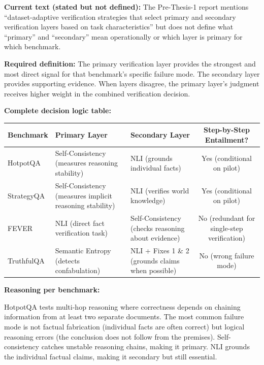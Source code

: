 \documentclass[11pt,a4paper]{article}
\newcommand{\architecturebox}[2]{%
\begin{tcolorbox}[enhanced,breakable,
  colback=LightTeal,colframe=Teal,boxrule=1.5pt,arc=4pt,
  left=8pt,right=8pt,top=6pt,bottom=6pt,
  title={\bfseries\small\color{white}#1},
  attach boxed title to top left={yshift=-2mm,xshift=6mm},
  boxed title style={colback=Teal,arc=3pt,boxrule=0pt,
    left=4pt,right=4pt,top=2pt,bottom=2pt}]
#2
\end{tcolorbox}}
\begin{document}
\architecturebox{VERIFICATION UPDATE 4: Explicit Primary/Secondary Layer Assignment Per Benchmark}{
\textbf{Current text (stated but not defined):} The Pre-Thesis-1 report mentions ``dataset-adaptive verification strategies that select primary and secondary verification layers based on task characteristics'' but does not define what ``primary'' and ``secondary'' mean operationally or which layer is primary for which benchmark.

\textbf{Required definition:} The primary verification layer provides the strongest and most direct signal for that benchmark's specific failure mode. The secondary layer provides supporting evidence. When layers disagree, the primary layer's judgment receives higher weight in the combined verification decision.

\textbf{Complete decision logic table:}

\begin{center}
\small
\begin{tabular}{lp{3.8cm}p{3.8cm}c}
\toprule
\textbf{Benchmark} & \textbf{Primary Layer} & \textbf{Secondary Layer} & \textbf{Step-by-Step Entailment?} \\
\midrule
HotpotQA & Self-Consistency (measures reasoning stability) & NLI (grounds individual facts) & Yes (conditional on pilot) \\[4pt]
StrategyQA & Self-Consistency (measures implicit reasoning stability) & NLI (verifies world knowledge) & Yes (conditional on pilot) \\[4pt]
FEVER & NLI (direct fact verification task) & Self-Consistency (checks reasoning about evidence) & No (redundant for single-step verification) \\[4pt]
TruthfulQA & Semantic Entropy (detects confabulation) & NLI + Fixes 1 \& 2 (grounds claims when possible) & No (wrong failure mode) \\
\bottomrule
\end{tabular}
\end{center}

\textbf{Reasoning per benchmark:}

HotpotQA tests multi-hop reasoning where correctness depends on chaining information from at least two separate documents. The most common failure mode is not factual fabrication (individual facts are often correct) but logical reasoning errors (the conclusion does not follow from the premises). Self-consistency catches unstable reasoning chains, making it primary. NLI grounds the individual factual claims, making it secondary but still essential.

}
\end{document}
